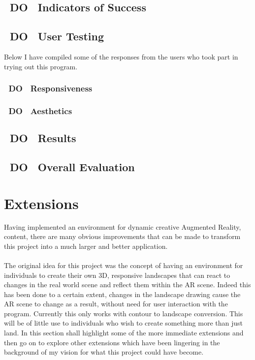 \documentclass[11pt]{article}
\begin{document}
\subsection{~DO~ Indicators of Success}

\subsection{~DO~ User Testing}



Below I have compiled some of the responses from the users who took part in
trying out this program.
\subsubsection{~DO~ Responsiveness}

\subsubsection{~DO~ Aesthetics}

\subsection{~DO~ Results}

\subsection{~DO~ Overall Evaluation}

\section{Extensions}
\label{chapter:extensions}
Having implemented an environment for dynamic creative Augmented Reality,
content, there are many obvious improvements that can be made to transform 
this project into a much larger and better application. \\
\\
The original idea for this project was the concept of having an environment
for individuals to create their own 3D, responsive landscapes that can react
to changes in the real world scene and reflect them within the AR scene. Indeed
this has been done to a certain extent, changes in the landscape drawing cause
the AR scene to change as a result, without need for user interaction with the
program. Currently this only works with contour to landscape conversion. This
will be of little use to individuals who wish to create something more than just
land. In this section shall highlight some of the more immediate extensions
and then go on to explore other extensions which have been lingering in the 
background of my vision for what this project could have become.
\end{document}
